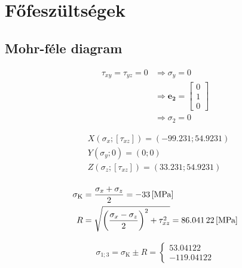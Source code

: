 \section{Főfeszültségek}

\subsection{Mohr-féle diagram}

\begin{align*}
	\tau_{xy} = \tau_{yz} = 0 &\Rightarrow \sigma_y = 0 \\
				  &\Rightarrow \pmb{e_2} = \begin{bmatrix}
		0 \\
		1 \\
		0
	\end{bmatrix} \\ 
				  &\Rightarrow \sigma_2 = 0
\end{align*}

\begin{align*}
	&X(\sigma_x; \left[\tau_{xz}\right]) = (-99.231; 54.9231) \\
    	&Y(\sigma_y; 0) = (0; 0) \\
	&Z(\sigma_z; \left[\tau_{xz}\right]) = (33.231; 54.9231) \\
\end{align*}

\begin{align*}
	\sigma_\text{K} &= \frac{\sigma_x + \sigma_z}{2} = \SI{-33}{[\mega\pascal]} \\
	R &= \sqrt{\left(\frac{\sigma_x - \sigma_z}{2}\right)^2 + \tau_{xz}^2} = \SI{86.04122}{[\mega\pascal]}
\end{align*}

\begin{align*}
	\sigma_{1;3} = \sigma_\text{K} \pm R = \begin{cases}
		53.04122 \\
		-119.04122
	\end{cases}
\end{align*}

